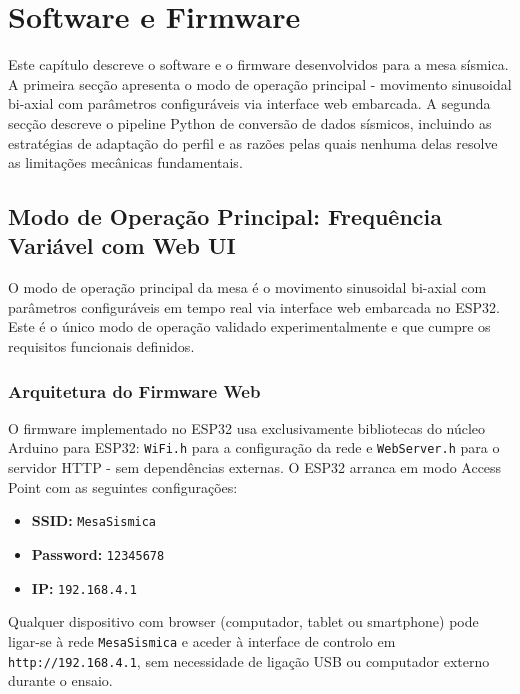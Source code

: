 \chapter{Software e Firmware}
\label{chapter:software}

\begin{introduction}
Este capítulo descreve o software e o firmware desenvolvidos para a mesa sísmica. A primeira secção apresenta o modo de operação principal - movimento sinusoidal bi-axial com parâmetros configuráveis via interface web embarcada. A segunda secção descreve o pipeline Python de conversão de dados sísmicos, incluindo as estratégias de adaptação do perfil e as razões pelas quais nenhuma delas resolve as limitações mecânicas fundamentais.
\end{introduction}



\section{Modo de Operação Principal: Frequência Variável com Web UI}
\label{sec:modo-principal}

O modo de operação principal da mesa é o movimento sinusoidal bi-axial com parâmetros configuráveis em tempo real via interface web embarcada no ESP32. Este é o único modo de operação validado experimentalmente e que cumpre os requisitos funcionais definidos.


\subsection{Arquitetura do Firmware Web}
\label{subsec:firmware-web}

O firmware implementado no ESP32 usa exclusivamente bibliotecas do núcleo Arduino para ESP32: \texttt{WiFi.h} para a configuração da rede e \texttt{WebServer.h} para o servidor HTTP - sem dependências externas. O ESP32 arranca em modo Access Point com as seguintes configurações:

\begin{itemize}
    \item \textbf{SSID:} \texttt{MesaSismica}
    \item \textbf{Password:} \texttt{12345678}
    \item \textbf{IP:} \texttt{192.168.4.1}
\end{itemize}

Qualquer dispositivo com browser (computador, tablet ou smartphone) pode ligar-se à rede \texttt{MesaSismica} e aceder à interface de controlo em \texttt{http://192.168.4.1}, sem necessidade de ligação USB ou computador externo durante o ensaio.


